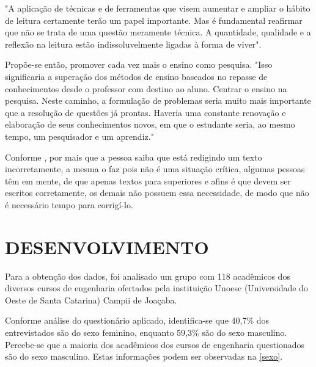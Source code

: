 \documentclass[
	article,			%
	11pt,				%
	oneside,			%
	a4paper,			%
	english,			%
	brazil,				%
	sumario=tradicional
	]{abntex2}
\begin{document}
"A aplicação de técnicas e de ferramentas que visem aumentar e ampliar o hábito de leitura certamente terão um papel importante. Mas é fundamental reafirmar que não se trata de uma questão meramente técnica. A quantidade, qualidade e a reflexão na leitura estão indissoluvelmente ligadas à forma de viver". \cite[p.9.143]{habitosleit}

Propõe-se então, promover cada vez mais o ensino como pesquisa. "Isso significaria a superação dos métodos de ensino baseados no repasse de conhecimentos desde o professor com destino ao aluno. Centrar o ensino na pesquisa. Neste caminho, a formulação de problemas seria muito mais importante que a resolução de questões já prontas. Haveria uma constante renovação e elaboração de seus conhecimentos novos, em que o estudante seria, ao mesmo tempo, um pesquisador e um aprendiz." \cite[p.9.143]{habitosleit}

Conforme , por mais que a pessoa saiba que está redigindo um texto incorretamente, a mesma o faz pois não é uma situação crítica, algumas pessoas têm em mente, de que apenas textos para superiores e afins é que devem ser escritos corretamente, os demais não possuem essa necessidade, de modo que não é necessário tempo para corrigí-lo.  


\section{DESENVOLVIMENTO}
Para a obtenção dos dados, foi analisado um grupo com 118 acadêmicos dos diversos cursos de engenharia ofertados pela instituição Unoesc (Universidade do Oeste de Santa Catarina) Campii de Joaçaba.

Conforme análise do questionário aplicado, identifica-se que 40,7\% dos entrevistados são do sexo feminino, enquanto 59,3\% são do sexo masculino.
Percebe-se que a maioria dos acadêmicos dos cursos de engenharia questionados são do sexo masculino. Estas informações podem ser observadas na \figurename{ \ref{sexo}}.
\end{document}
